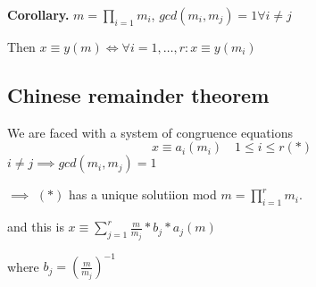 \textbf{Corollary.}
$m = \prod_{i=1} m_i$, $ gcd(m_i, m_j) = 1 \forall i \neq j$

Then $x \equiv y (m) \iff \forall i = 1, \ldots, r : x \equiv y (m_i)$

\subsection{Chinese remainder theorem}
We are faced with a system of congruence equations
\[
  x \equiv a_i (m_i) \quad 1 \leq i \leq r (*)
\]
$i \neq j \implies gcd(m_i, m_j) = 1$

$\implies$ $(*)$ has a unique solutiion mod $m = \prod_{i = 1}^r m_i$.

and this is $x \equiv \sum_{j=1}^r \frac {m}{m_j} * b_j * a_j (m)$

where $b_j = \left( \frac{m}{m_j} \right) ^{-1}$
